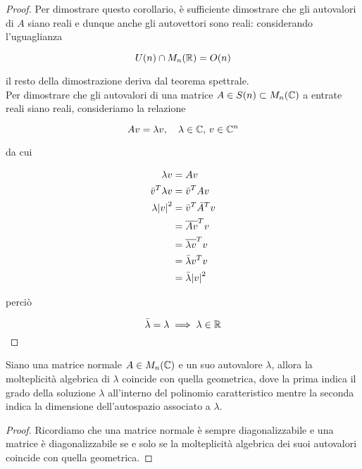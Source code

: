 \begin{proof}
	Per dimostrare questo corollario, è sufficiente dimostrare che gli autovalori di $ A $ siano reali e dunque anche gli autovettori sono reali: considerando l'uguaglianza
	
	\begin{equation}
		U(n) \cap M_{n}(\mathbb{R}) = O(n)
	\end{equation}

	il resto della dimostrazione deriva dal teorema spettrale.\\
	Per dimostrare che gli autovalori di una matrice $ A \in S(n) \subset M_{n}(\mathbb{C}) $  a entrate reali siano reali, consideriamo la relazione
	
	\begin{equation}
		A v = \lambda v \qcomma \lambda \in \C, \, v \in \C^{n}
	\end{equation}

	da cui

	\begin{align}
		\begin{split}
			\lambda v &= A v \\
			\bar{v}^{T} \lambda v &= \bar{v}^{T} A v \\
			\lambda \abs{v}^{2} &= \bar{v}^{T} \bar{A}^{T} v \\
			&= \overline{A v}^{T} v \\
			&= \overline{\lambda v}^{T} v \\
			&= \bar{\lambda} v^{T} v \\
			&= \bar{\lambda} \abs{v}^{2}
		\end{split}
	\end{align}

	perciò
	
	\begin{equation}
		\bar{\lambda} = \lambda \implies \lambda \in \mathbb{R}
	\end{equation}
\end{proof}

\begin{corollary}[2]
	Siano una matrice normale $ A \in M_{n}(\mathbb{C}) $ e un suo autovalore $ \lambda $, allora la molteplicità algebrica di $ \lambda $ coincide con quella geometrica, dove la prima indica il grado della soluzione $ \lambda $ all'interno del polinomio caratteristico mentre la seconda indica la dimensione dell'autospazio associato a $ \lambda $.
\end{corollary}

\begin{proof}
	Ricordiamo che una matrice normale è sempre diagonalizzabile e una matrice è diagonalizzabile se e solo se la molteplicità algebrica dei suoi autovalori coincide con quella geometrica.
\end{proof}

